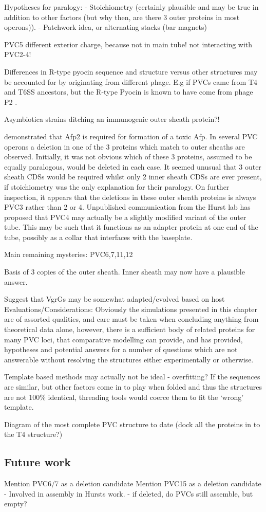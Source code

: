 Hypotheses for paralogy:
 - Stoichiometry (certainly plausible and may be true in addition to other factors (but why then, are there 3 outer proteins in most operons)).
 - Patchwork idea, or alternating stacks (bar magnets)


PVC5 different exterior charge, because not in main tube! not interacting with PVC2-4!

Differences in R-type pyocin sequence and structure versus other structures may be accounted for by originating from different phage. E.g if PVCs came from T4 and T6SS ancestors, but the R-type Pyocin is known to have come from phage P2 \citep{Nakayama2000}.


Asymbiotica strains ditching an immunogenic outer sheath protein?!

\cite{Hurst2004} demonstrated that Afp2 is required for formation of a toxic Afp. In several PVC operons a deletion in one of the 3 proteins which match to outer sheaths are observed. Initially, it was not obvious which of these 3 proteins, assumed to be equally paralogous, would be deleted in each case. It seemed unusual that 3 outer sheath CDSs would be required whilst only 2 inner sheath CDSs are ever present, if stoichiometry was the only explanation for their paralogy. On further inspection, it appears that the deletions in these outer sheath proteins is always PVC3 rather than 2 or 4. Unpublished communication from the Hurst lab has proposed that PVC4 may actually be a slightly modified variant of the outer tube. This may be such that it functions as an adapter protein at one end of the tube, possibly as a collar that interfaces with the baseplate.

Main remaining mysteries:
PVC6,7,11,12

Basis of 3 copies of the outer sheath. Inner sheath may now have a plausible answer.

Suggest that VgrGs may be somewhat adapted/evolved based on host
Evaluations/Considerations:
Obviously the simulations presented in this chapter are of assorted qualities, and care must be taken when concluding anything from theoretical data alone, however, there is a sufficient body of related proteins for many PVC loci, that comparative modelling can provide, and has provided, hypotheses and potential answers for a number of questions which are not answerable without resolving the structures either experimentally or otherwise.

Template based methods may actually not be ideal - overfitting? If the sequences are similar, but other factors come in to play when folded and thus the structures are not 100\% identical, threading tools would coerce them to fit the `wrong' template.

Diagram of the most complete PVC structure to date (dock all the proteins in to the T4 structure?)


\subsection{Future work}
Mention PVC6/7 as a deletion candidate
Mention PVC15 as a deletion candidate
 - Involved in assembly in Hursts work.
 - if deleted, do PVCs still assemble, but empty?




